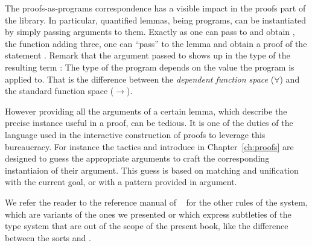 


The proofs-as-programs correspondence has a visible impact in the proofs
part of the \mcbMC{} library.  In particular, quantified lemmas, being programs,
can be instantiated by simply passing arguments to them.  Exactly as one can
pass  to  and obtain , the function adding three, one
can ``pass''  to the lemma  and obtain a proof of the statement
.  Remark that the argument passed to 
shows up in the type of the resulting term :  The type of the
 program depends on the value the program is applied to.  That is the
difference between the \emph{dependent function space} ($\forall$)
and the standard function space ($\to$).


However providing all the arguments of a certain lemma, which describe
the precise instance useful in a proof, can be tedious. It is one of
the duties of the language used in the interactive construction of
proofs to leverage this bureaucracy. For instance the tactics
 and  introduce in Chapter~\ref{ch:proofs} are
designed to guess the appropriate arguments to craft the
corresponding instantiaion of their argument. This guess is based on
matching and unification with the current goal, or with a pattern
provided in argument.




We refer the reader
to the reference manual of \Coq{}~\cite{Coq:manual} for the other
rules of the system, which are variants of the ones we presented or
which express subtleties of the type system that are out of the scope of
the present book, like the difference between the sorts  and
.





